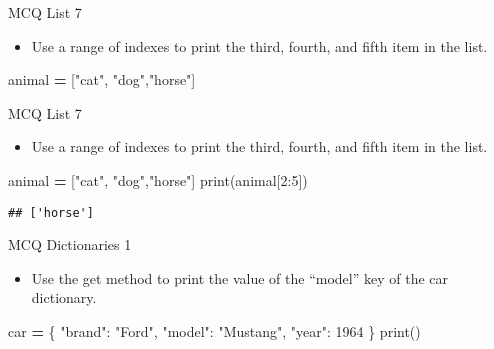 \documentclass[
  8pt,
  ignorenonframetext,
]{beamer}
\newenvironment{Shaded}{\begin{snugshade}}{\end{snugshade}}
\newcommand{\BuiltInTok}[1]{#1}
\newcommand{\DecValTok}[1]{\textcolor[rgb]{0.00,0.00,0.81}{#1}}
\newcommand{\NormalTok}[1]{#1}
\newcommand{\OperatorTok}[1]{\textcolor[rgb]{0.81,0.36,0.00}{\textbf{#1}}}
\newcommand{\StringTok}[1]{\textcolor[rgb]{0.31,0.60,0.02}{#1}}
\providecommand{\tightlist}{%
  \setlength{\itemsep}{0pt}\setlength{\parskip}{0pt}}
\begin{document}
\begin{frame}[fragile]{MCQ List 7}
\protect\hypertarget{mcq-list-7}{}
\begin{itemize}
\tightlist
\item
  Use a range of indexes to print the third, fourth, and fifth item in
  the list.
\end{itemize}

\begin{Shaded}
\begin{Highlighting}[]
\NormalTok{animal }\OperatorTok{=}\NormalTok{ [}\StringTok{"cat"}\NormalTok{, }\StringTok{"dog"}\NormalTok{,}\StringTok{"horse"}\NormalTok{]}
\end{Highlighting}
\end{Shaded}
\end{frame}

\begin{frame}[fragile]{MCQ List 7}
\protect\hypertarget{mcq-list-7-1}{}
\begin{itemize}
\tightlist
\item
  Use a range of indexes to print the third, fourth, and fifth item in
  the list.
\end{itemize}

\begin{Shaded}
\begin{Highlighting}[]
\NormalTok{animal }\OperatorTok{=}\NormalTok{ [}\StringTok{"cat"}\NormalTok{, }\StringTok{"dog"}\NormalTok{,}\StringTok{"horse"}\NormalTok{]}
\BuiltInTok{print}\NormalTok{(animal[}\DecValTok{2}\NormalTok{:}\DecValTok{5}\NormalTok{])}
\end{Highlighting}
\end{Shaded}

\begin{verbatim}
## ['horse']
\end{verbatim}
\end{frame}

\begin{frame}[fragile]{MCQ Dictionaries 1}
\protect\hypertarget{mcq-dictionaries-1}{}
\begin{itemize}
\tightlist
\item
  Use the get method to print the value of the ``model'' key of the car
  dictionary.
\end{itemize}

\begin{Shaded}
\begin{Highlighting}[]
\NormalTok{car }\OperatorTok{=}\NormalTok{   \{}
  \StringTok{"brand"}\NormalTok{: }\StringTok{"Ford"}\NormalTok{,}
  \StringTok{"model"}\NormalTok{: }\StringTok{"Mustang"}\NormalTok{,}
  \StringTok{"year"}\NormalTok{: }\DecValTok{1964}
\NormalTok{\}}
\BuiltInTok{print}\NormalTok{()}
\end{Highlighting}
\end{Shaded}
\end{frame}
\end{document}

